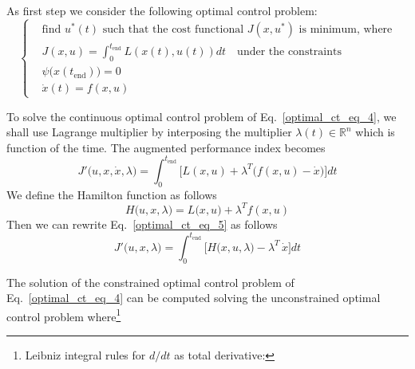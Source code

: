 \documentclass[12pt,a4paper,oneside]{book}
\begin{document}
\begin{onehalfspace}
As first step we consider the following optimal control problem: 
\begin{equation}\label{optimal_ct_eq_4}
	\left\lbrace \begin{aligned}
		& \text{find $u^*(t)$ such that the cost functional $J(x,u^*)$ is 
			minimum, where} \\[8pt]
		& J(x,u) = \int_{0}^{t_{\text{end}}}L(x(t),u(t))dt \quad\text{under the 
			constraints} \\[8pt]
		& \psi\big(x(t_{\text{end}})\big) = 0 \\[8pt]
		& \dot{x}(t)=f(x,u) 
	\end{aligned}\right. 
\end{equation}
\begin{mybox}
	To solve the continuous optimal control problem of Eq.~\eqref{optimal_ct_eq_4}, we shall use Lagrange 
	multiplier by interposing the multiplier $\lambda(t)\in\mathbb{R}^n$ which is 
	function of the time. The augmented performance index becomes
	\begin{equation}\label{optimal_ct_eq_5}
		J'\big(u,x,\dot{x},\lambda\big) = 
		\int_{0}^{t_{\text{end}}}\Bigg[L(x,u)+\lambda^T\Big(f(x,u)-\dot{x}\Big)\Bigg]dt
	\end{equation}
	We define the Hamilton function as follows
	\begin{equation}\label{optimal_ct_eq_6}
		H\big(u,x,\lambda\big) = L\big(x,u\big)+\lambda^Tf(x,u)
	\end{equation} 
	Then we can rewrite Eq.~\eqref{optimal_ct_eq_5} as follows
	\begin{equation}\label{optimal_ct_eq_7}
		J'\big(u,x,\lambda\big) = \int_{0}^{t_{\text{end}}}\Bigg[H\big(x,u,\lambda\big) - 
		\lambda^T\,\dot{x}\Bigg]dt
	\end{equation}
\end{mybox}
The solution of the constrained optimal control problem of Eq.~\eqref{optimal_ct_eq_4} can be computed solving the unconstrained optimal control problem
where\footnote{Leibniz integral rules for $d/dt$ as total derivative:
}
\end{onehalfspace}
\end{document}
